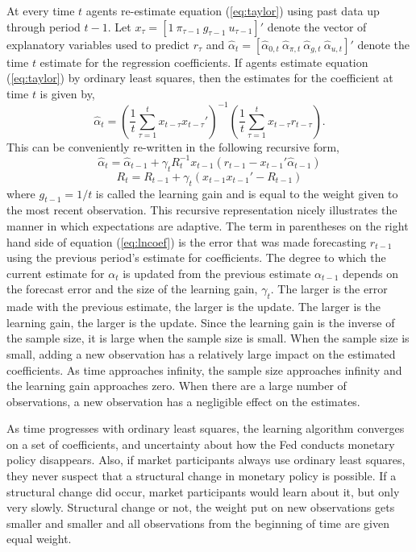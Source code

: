 \documentclass[12pt]{article}
\newcommand{\beq}{\begin{equation}}
\newcommand{\eeq}{\end{equation}}
\begin{document}
At every time $t$ agents re-estimate equation (\ref{eq:taylor}) using past data up through period $t-1$.  Let $x_{\tau} = [1~ \pi_{\tau-1}~ g_{\tau-1}~ u_{\tau-1}]'$ denote the vector of explanatory variables used to predict $r_{\tau}$ and $\hat{\alpha}_t = [\hat{\alpha}_{0,t}~ \hat{\alpha}_{\pi,t}~  \hat{\alpha}_{g,t}~  \hat{\alpha}_{u,t}]'$ denote the time $t$ estimate for the regression coefficients.  If agents estimate equation (\ref{eq:taylor}) by ordinary least squares, then the estimates for the coefficient at time $t$ is given by,
\beq \label{eq:ols} \hat{\alpha}_t = \left( \frac{1}{t} \sum_{\tau=1}^{t} x_{t-\tau} x_{t-\tau}' \right)^{-1}  \left( \frac{1}{t} \sum_{\tau=1}^{t} x_{t-\tau}  r_{t-\tau} \right). \eeq
This can be conveniently re-written in the following recursive form,
\beq \label{eq:lncoef} \hat{\alpha}_t = \hat{\alpha}_{t-1} + \gamma_t  R_t^{-1} x_{t-1} \left(r_{t-1} - x_{t-1}'\hat{\alpha}_{t-1}\right) \eeq
\beq \label{eq:lnR} R_t = R_{t-1} + \gamma_t \left(x_{t-1} x_{t-1}' - R_{t-1}\right) \eeq
where $g_{t-1} = 1/t$ is called the learning gain and is equal to the weight given to the most recent observation.  This recursive representation nicely illustrates the manner in which expectations are adaptive.  The term in parentheses on the right hand side of equation (\ref{eq:lncoef}) is the error that was made forecasting $r_{t-1}$ using the previous period's estimate for coefficients.  The degree to which the current estimate for $\alpha_t$ is updated from the previous estimate $\alpha_{t-1}$ depends on the forecast error and the size of the learning gain, $\gamma_t$.  The larger is the error made with the previous estimate, the larger is the update.  The larger is the learning gain, the larger is the update.  Since the learning gain is the inverse of the sample size, it is large when the sample size is small.  When the sample size is small, adding a new observation has a relatively large impact on the estimated coefficients.  As time approaches infinity, the sample size approaches infinity and the learning gain approaches zero.  When there are a large number of observations, a new observation has a negligible effect on the estimates.
 
As time progresses with ordinary least squares, the learning algorithm converges on a set of coefficients, and uncertainty about how the Fed conducts monetary policy disappears.  Also, if market participants always use ordinary least squares, they never suspect that a structural change in monetary policy is possible.  If a structural change did occur, market participants would learn about it, but only very slowly.  Structural change or not, the weight put on new observations gets smaller and smaller and all observations from the beginning of time are given equal weight.  
\end{document}
